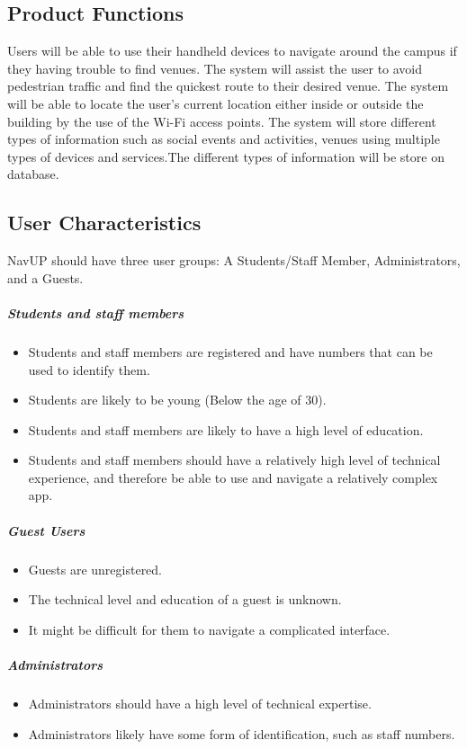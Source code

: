 \documentclass[english]{article}
\begin{document}
		\subsection{Product Functions}
            Users will be able to use their handheld devices to navigate around the campus if they having trouble to find venues. The system will assist the user to avoid pedestrian traffic and find the quickest route to their desired venue. The system will be able to locate the user’s current location either inside or outside the building by the use of the Wi-Fi access points. The system will store different types of information such as social events and activities, venues using multiple types of devices and services.The different types of information will be store on database. 

		\subsection{User Characteristics}
				NavUP should have three user groups: A Students/Staff Member, Administrators, and a Guests.
				\subparagraph{Students and staff members}
    				\begin{itemize}
    					\item Students and staff members are registered and have numbers that can be used to identify them.
    					\item Students are likely to be young (Below the age of 30).
    					\item Students and staff members are likely to have a high level of education.
    					\item Students and staff members should have a relatively high level of technical experience, and therefore be able to use and navigate a relatively complex app.
    				\end{itemize}
				\subparagraph{Guest Users}
    				\begin{itemize}
    					\item Guests are unregistered.
    					\item The technical level and education of a guest is unknown. 
    					\item It might be difficult for them to navigate a complicated interface.
    
    				\end{itemize}
				\subparagraph{Administrators}
    				\begin{itemize}
    					\item Administrators should have a high level of technical expertise.
    					\item Administrators likely have some form of identification, such as staff numbers.
    				\end{itemize}
\end{document}

